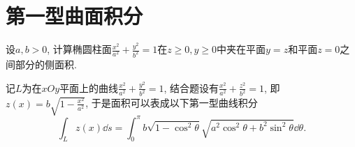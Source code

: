 \section{第一型曲面积分}
\begin{quiza}
\woe 设\(a,b>0\), 计算椭圆柱面\(\frac{x^2}{a^2}+\frac{y^2}{b^2}=1\)在\(z\geqslant 0,y\geqslant 0\)中夹在平面\(y=z\)和平面\(z=0\)之间部分的侧面积.
\begin{solution}
记\(L\)为在\(xOy\)平面上的曲线\(\frac{x^2}{a^2}+\frac{y^2}{b^2}=1\), 结合题设有\(\frac{x^2}{a^2}+\frac{z^2}{b^2}=1\), 即\(z(x)=b\sqrt{1-\frac{x^2}{a^2}}\), 于是面积可以表成以下第一型曲线积分\[\int_Lz(x)\dd s=\int_{0}^{\pi}b\sqrt{1-\cos^2\theta}\sqrt{a^2\cos^2\theta+b^2\sin^2\theta}\dd\theta.\]


\end{solution}
\end{quiza}
